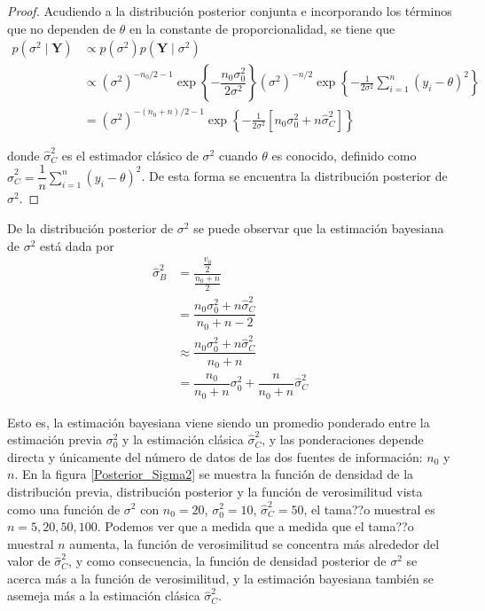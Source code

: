     \begin{proof}
    Acudiendo a la distribuci\'on posterior conjunta e incorporando los t\'erminos que no dependen de $\theta$ en la constante de proporcionalidad, se tiene que
    \begin{align*}
    p(\sigma^2 \mid \mathbf{Y})&\propto p(\sigma^2)p(\mathbf{Y}\mid \sigma^2) \\
    &\propto (\sigma^2)^{-n_0/2-1}\exp\left\{-\dfrac{n_0\sigma_0^2}{2\sigma^2}\right\}(\sigma^2)^{-n/2}\exp\left\{-\frac{1}{2\sigma^2}\sum_{i=1}^n(y_i-\theta)^2\right\}\\
    &= (\sigma^2)^{-(n_0+n)/2-1}\exp\left\{-\frac{1}{2\sigma^2}\left[n_0\sigma_0^2+n\hat{\sigma}^2_C\right]\right\}
    \end{align*}
    
    donde $\hat{\sigma}^2_C$ es el estimador cl\'asico de $\sigma^2$ cuando $\theta$ es conocido, definido como $\hat{\sigma}^2_C=\dfrac{1}{n}\sum_{i=1}^n(y_i-\theta)^2$. De esta forma se encuentra la distribuci\'on posterior de $\sigma^2$.
    \end{proof}
    
    De la distribuci\'on posterior de $\sigma^2$ se puede observar que la estimaci\'on bayesiana de $\sigma^2$ est\'a dada por 
    \begin{align*}
    \hat{\sigma}^2_B&=\dfrac{\frac{v_0}{2}}{\frac{n_0+n}{2}}\\
    &=\dfrac{n_0\sigma^2_0+n\hat{\sigma}^2_C}{n_0+n-2}\\
    &\approx \dfrac{n_0\sigma^2_0+n\hat{\sigma}^2_C}{n_0+n}\\
    &=\dfrac{n_0}{n_0+n}\sigma^2_0+\dfrac{n}{n_0+n}\hat{\sigma}^2_C
    \end{align*}
    
    Esto es, la estimaci\'on bayesiana viene siendo un promedio ponderado entre la estimaci\'on previa $\sigma^2_0$ y la estimaci\'on cl\'asica $\hat{\sigma}^2_C$, y las ponderaciones depende directa y \'unicamente del n\'umero de datos de las dos fuentes de informaci\'on: $n_0$ y $n$. En la figura \ref{Posterior_Sigma2} se muestra la funci\'on de densidad de la distribuci\'on previa, distribuci\'on posterior y la funci\'on de verosimilitud vista como una funci\'on de $\sigma^2$ con $n_0=20$, $\sigma^2_0=10$, $\hat{\sigma}^2_C=50$, el tama??o muestral es $n=5,20,50,100$. Podemos ver que a medida que a medida que el tama??o muestral $n$ aumenta, la funci\'on de verosimilitud se concentra m\'as alrededor del valor de $\hat{\sigma}^2_C$, y como consecuencia, la funci\'on de densidad posterior de $\sigma^2$ se acerca m\'as a la funci\'on de verosimilitud, y la estimaci\'on bayesiana tambi\'en se asemeja m\'as a la estimaci\'on cl\'asica $\hat{\sigma}^2_C$.
    
